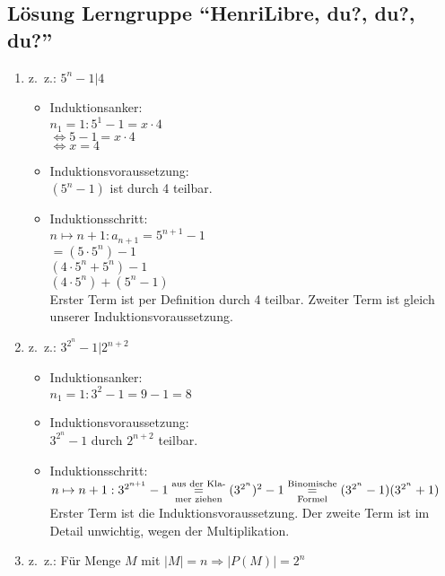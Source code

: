 \documentclass[12pt,a4paper]{report}
\begin{document}
	\subsection{Lösung Lerngruppe \enquote{HenriLibre, du?, du?, du?}}
	\begin{enumerate}
	\item z.~z.: $5^n - 1 | 4 $ 
		\begin{itemize}
			\item Induktionsanker:\\
			$n_1 = 1: 5^1 - 1 = x \cdot 4$ \\
			$\Leftrightarrow 5-1 = x \cdot 4 $ \\
			$\Leftrightarrow x = 4 $ \\
			\item Induktionsvoraussetzung:\\
			$ (5^n -1)$ ist durch 4 teilbar.\\
			\item Induktionsschritt: \\ 
			$ n \mapsto n+1: a_{n+1} = 5^{n+1}-1$ \\ 
			$ = (5 \cdot 5^n)-1$ \\
			$ (4 \cdot 5^n + 5^n) -1$ \\
			$ (4 \cdot 5^n) + (5^n -1)$\\
			Erster Term ist per Definition durch 4 teilbar. Zweiter Term ist gleich unserer Induktionsvoraussetzung.  
		\end{itemize}
	\item z.~z.: $ 3^{2^n}-1|2^{n+2} $ 
		\begin{itemize}
			\item Induktionsanker:\\
			$ n_1 = 1: 3^2 -1 = 9 - 1 = 8 $
			\item Induktionsvoraussetzung:\\
			$ 3^{2^n} - 1 $ durch $ 2^{n+2} $ teilbar.
			\item Induktionsschritt: \\ 
			$ n \mapsto n+1: 3^{2^{n+1}} -1 \\
			\overset{\text{aus der Kla-}}{\underset{\text{mer ziehen}}{=}} (3^{2^n})^2 -1\\ \overset{\text{Binomische}}{\underset{\text{Formel}}{=}} (3^{2^n}-1)(3^{2^n}+1)$ \\
			Erster Term ist die Induktionsvoraussetzung. Der zweite Term ist im Detail unwichtig, wegen der Multiplikation.
		\end{itemize}
	\item z.~z.: Für Menge $M$ mit $|M| = n \Rightarrow |P(M)|=2^n$

\end{enumerate}
\end{document}
